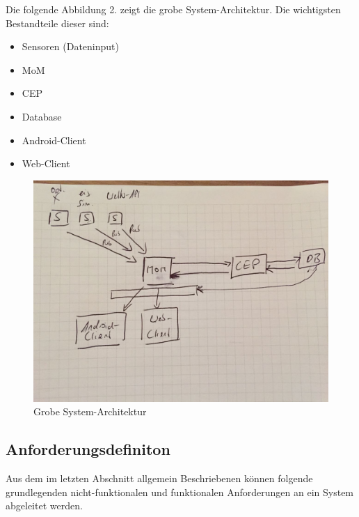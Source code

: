 \documentclass[paper,oneside,onecolumn,notitlepage,bibtotocnumbered,fontsize=12pt,bigheadings,ngerman]{scrartcl}
\begin{document}
Die folgende Abbildung 2. zeigt die grobe System-Architektur. Die wichtigsten Bestandteile dieser sind:
\begin{itemize}
\item Sensoren (Dateninput)
\item MoM
\item CEP
\item Database
\item Android-Client
\item Web-Client
\end{itemize}
\begin{figure}[!ht]
\centering
\includegraphics[width=450pt]{System-Archtitektur.jpeg}
\caption{Grobe System-Architektur}
\end{figure}
\clearpage

\subsection{Anforderungsdefiniton}
Aus dem im letzten Abschnitt allgemein Beschriebenen können folgende grundlegenden nicht-funktionalen und funktionalen Anforderungen an ein System abgeleitet werden. 
\end{document}
